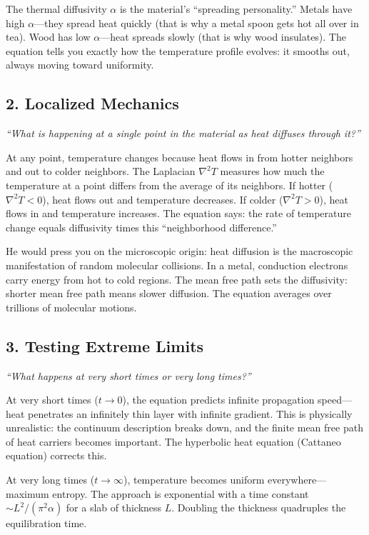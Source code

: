 \documentclass[11pt,openright]{book}
\begin{document}
The thermal diffusivity $\alpha$ is the material's ``spreading personality.'' Metals have high $\alpha$---they spread heat quickly (that is why a metal spoon gets hot all over in tea). Wood has low $\alpha$---heat spreads slowly (that is why wood insulates). The equation tells you exactly how the temperature profile evolves: it smooths out, always moving toward uniformity.

\subsection*{2. Localized Mechanics}
\textit{``What is happening at a single point in the material as heat diffuses through it?''}

At any point, temperature changes because heat flows in from hotter neighbors and out to colder neighbors. The Laplacian $\nabla^2 T$ measures how much the temperature at a point differs from the average of its neighbors. If hotter ($\nabla^2 T < 0$), heat flows out and temperature decreases. If colder ($\nabla^2 T > 0$), heat flows in and temperature increases. The equation says: the rate of temperature change equals diffusivity times this ``neighborhood difference.''

He would press you on the microscopic origin: heat diffusion is the macroscopic manifestation of random molecular collisions. In a metal, conduction electrons carry energy from hot to cold regions. The mean free path sets the diffusivity: shorter mean free path means slower diffusion. The equation averages over trillions of molecular motions.

\subsection*{3. Testing Extreme Limits}
\textit{``What happens at very short times or very long times?''}

At very short times ($t \to 0$), the equation predicts infinite propagation speed---heat penetrates an infinitely thin layer with infinite gradient. This is physically unrealistic: the continuum description breaks down, and the finite mean free path of heat carriers becomes important. The hyperbolic heat equation (Cattaneo equation) corrects this.

At very long times ($t \to \infty$), temperature becomes uniform everywhere---maximum entropy. The approach is exponential with a time constant $\sim L^2/(\pi^2 \alpha)$ for a slab of thickness $L$. Doubling the thickness quadruples the equilibration time.
\end{document}
